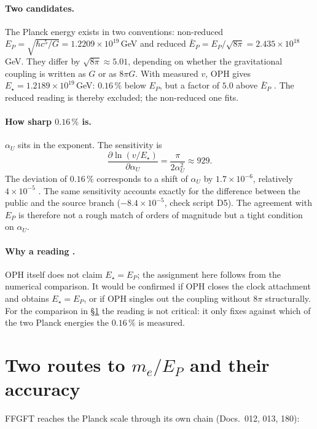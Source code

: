 \paragraph{Two candidates.} The Planck energy exists in two conventions:
non-reduced $E_P=\sqrt{\hbar c^5/G}=1.2209\times10^{19}$\,GeV and reduced
$\bar E_P=E_P/\sqrt{8\pi}=2.435\times10^{18}$\,GeV. They differ by
$\sqrt{8\pi}\approx5.01$, depending on whether the gravitational coupling is
written as $G$ or as $8\pi G$. With measured $v$, OPH gives
$E_\star=1.2189\times10^{19}$\,GeV: $0.16\,\%$ below $E_P$, but a factor of
$5.0$ above $\bar E_P$ \KM. The reduced reading is thereby excluded; the
non-reduced one fits.

\paragraph{How sharp $0.16\,\%$ is.} $\alpha_U$ sits in the exponent. The
sensitivity is
\begin{equation}
  \frac{\partial\ln(v/E_\star)}{\partial\alpha_U}=\frac{\pi}{2\alpha_U^2}\approx929 .
\end{equation}
The deviation of $0.16\,\%$ corresponds to a shift of $\alpha_U$ by
$1.7\times10^{-6}$, relatively $4\times10^{-5}$ \BM. The same sensitivity
accounts exactly for the difference between the public and the source branch
($-8.4\times10^{-5}$, check script D5). The agreement with $E_P$ is therefore
not a rough match of orders of magnitude but a tight condition on $\alpha_U$.

\paragraph{Why a reading \SM.} OPH itself does not claim $E_\star=E_P$; the
assignment here follows from the numerical comparison. It would be confirmed
if OPH closes the clock attachment and obtains $E_\star=E_P$, or if OPH
singles out the coupling without $8\pi$ structurally. For the comparison in
§\ref{sec:wege} the reading is not critical: it only fixes against which of
the two Planck energies the $0.16\,\%$ is measured.

\section{Two routes to $m_e/E_P$ and their accuracy}\label{sec:wege}

FFGFT reaches the Planck scale through its own chain (Docs.~012, 013, 180):

